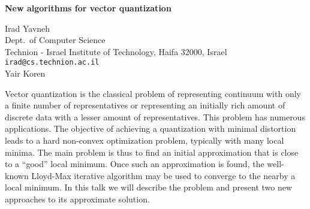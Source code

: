 \documentclass{report}
\begin{document}

\begin{center}
{\large
{\bf New algorithms for vector quantization}}

	Irad Yavneh \\
	Dept.~of Computer Science \\
	Technion - Israel Institute of Technology, Haifa 32000, Israel \\
	{\tt irad@cs.technion.ac.il} \\
	Yair Koren
\end{center}
Vector quantization is the classical problem of representing
continuum with only a finite number of representatives or
representing an initially rich amount of discrete data with
a lesser amount of representatives. This problem has
numerous applications. The objective of achieving a
quantization with minimal distortion leads to a hard
non-convex optimization problem, typically with many local
minima. The main problem is thus to find an initial
approximation that is close to a ``good'' local minimum.
Once such an approximation is found, the well-known
Lloyd-Max iterative algorithm may be used to converge to the
nearby a local minimum. In this talk we will describe the
problem and present two new approaches to its approximate
solution.



\end{document}
